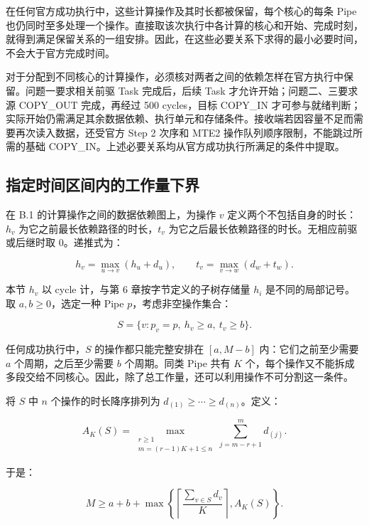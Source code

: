 \documentclass[anonymous,notoc]{gmcm2026}
\begin{document}
在任何官方成功执行中，这些计算操作及其时长都被保留，每个核心的每条 Pipe 也仍同时至多处理一个操作。直接取该次执行中各计算的核心和开始、完成时刻，就得到满足保留关系的一组安排。因此，在这些必要关系下求得的最小必要时间，不会大于官方完成时间。

对于分配到不同核心的计算操作，必须核对两者之间的依赖怎样在官方执行中保留。问题一要求相关前驱 Task 完成后，后续 Task 才允许开始；问题二、三要求源 COPY\_OUT 完成，再经过 500 cycles，目标 COPY\_IN 才可参与就绪判断；实际开始仍需满足其余数据依赖、执行单元和存储条件。接收端若因容量不足而需要再次读入数据，还受官方 Step 2 次序和 MTE2 操作队列顺序限制，不能跳过所需的基础 COPY\_IN。上述必要关系均从官方成功执行所满足的条件中提取。

\subsection{指定时间区间内的工作量下界}

在 B.1 的计算操作之间的数据依赖图上，为操作 \(v\) 定义两个不包括自身的时长：\(h_v\) 为它之前最长依赖路径的时长，\(t_v\) 为它之后最长依赖路径的时长。无相应前驱或后继时取 0。递推式为：

\begin{equation}
h_v = \max_{u \to v}(h_u + d_u), \qquad t_v = \max_{v \to w}(d_w + t_w).
\end{equation}

本节 \(h_v\) 以 cycle 计，与第 6 章按字节定义的子树存储量 \(h_i\) 是不同的局部记号。取 \(a, b \ge 0\)，选定一种 Pipe \(p\)，考虑非空操作集合：

\begin{equation}
S = \{v: p_v = p, \ h_v \ge a, \ t_v \ge b\}.
\end{equation}

任何成功执行中，\(S\) 的操作都只能完整安排在 \([a, M - b]\) 内：它们之前至少需要 \(a\) 个周期，之后至少需要 \(b\) 个周期。同类 Pipe 共有 \(K\) 个，每个操作又不能拆成多段交给不同核心。因此，除了总工作量，还可以利用操作不可分割这一条件。

将 \(S\) 中 \(n\) 个操作的时长降序排列为 \(d_{(1)} \ge \cdots \ge d_{(n)}\)。定义：

\begin{equation}
A_K(S) = \max_{\substack{r \ge 1 \\ m = (r-1)K+1 \le n}} \sum_{j=m-r+1}^{m} d_{(j)}.
\end{equation}

于是：

\begin{equation}
M \ge a + b + \max\left\{\left\lceil\frac{\sum_{v \in S} d_v}{K}\right\rceil, A_K(S)\right\}.
\end{equation}
\end{document}
